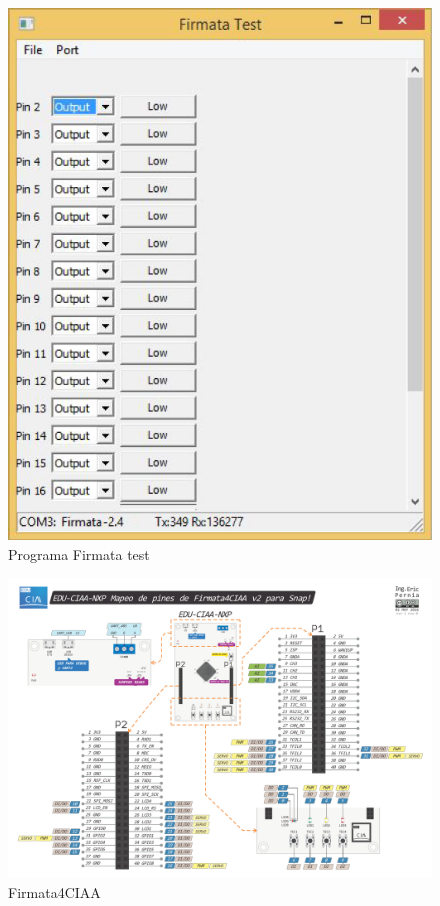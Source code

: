 \begin{figure}[!htbp]
	\centering
	\includegraphics[width=12cm]{./Figures/firmataTest.png}
	\caption{Programa Firmata test}
	\label{fig:firmataTest}
\end{figure}

\begin{figure}[!htbp]
	\centering
	\includegraphics[width=12cm]{./Appendices/MapeoPinesFirmata4CIAAv2.pdf}
	\caption{Firmata4CIAA}
	\label{fig:MapeoPinesFirmata4CIAAv2}
\end{figure}

